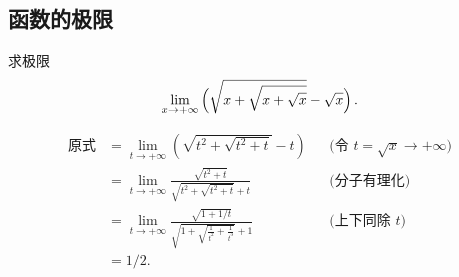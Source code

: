 \subsection{函数的极限}

\begin{exercise}[换元, 分子有理化]
    求极限
    \[
    \lim_{x \to +\infty} \del[2]{\sqrt{x + \sqrt{x + \sqrt{x}}} - \sqrt{x}}.
    \]
\end{exercise}

\begin{solution}
    \begin{align*}
    \text{原式} 
    &= \lim_{t \to +\infty} (\sqrt{t^2 + \sqrt{t^2 + t}} - t) && \text{(令 $t = \sqrt{x} \to +\infty$)} \\
    &= \lim_{t \to +\infty} \frac{\sqrt{t^2 + t}}{\sqrt{t^2 + \sqrt{t^2 + t}} + t}  && \text{(分子有理化)} \\[5pt]
    &= \lim_{t \to +\infty} \frac{\sqrt{1 + 1/t}}{\sqrt{1 + \sqrt{\frac{1}{t^2} + \frac{1}{t^3}}} + 1} && \text{(上下同除 $t$)} \\
    &= 1/2. 
    \end{align*}
\end{solution}

